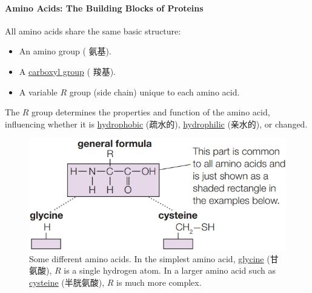 \paragraph{Amino Acids: The Building Blocks of Proteins}
All amino acids share the same basic structure:
\begin{itemize}
    \item An amino group ( 氨基).
    \item A \underline{carboxyl group} ( 羧基).
    \item A variable $R$ group (side chain) unique to each amino acid.
\end{itemize}
The $R$ group determines the properties and function of the amino acid, influencing whether it is \underline{hydrophobic} (疏水的),
\underline{hydrophilic} (亲水的), or changed.
\begin{figure}[H]
    \centering
    \includegraphics[scale=0.38]{Biology/1A/Images/1A-5-1.png}
    \caption{Some different amino acids. In the simplest amino acid, \underline{glycine} (甘氨酸), $R$ is a single hydrogen atom.
    In a larger amino acid such as \underline{cysteine} (半胱氨酸), $R$ is much more complex.}
\end{figure}

